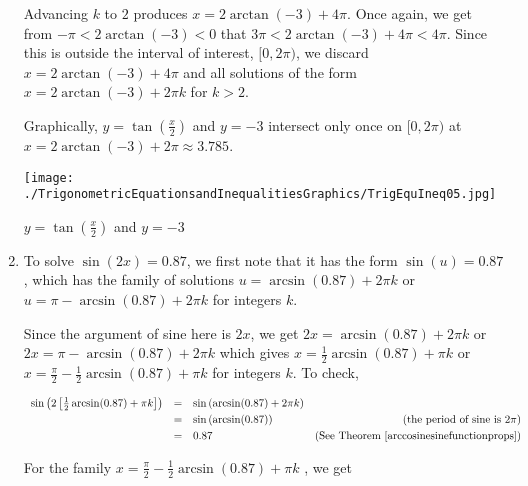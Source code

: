 \documentclass{ximera}
\begin{document}
\begin{example}
\begin{enumerate}
\smallskip

Advancing $k$ to $2$ produces $x = 2\arctan(-3) + 4\pi$. Once again, we get from $-\pi < 2\arctan(-3) < 0$ that $3\pi < 2\arctan(-3) + 4\pi < 4\pi$.  Since this is outside the interval of interest, $[0,2\pi)$,  we discard $x = 2\arctan(-3) + 4\pi$ and all solutions of the form $x = 2\arctan(-3) + 2\pi k$ for $k > 2$.   

\smallskip

Graphically, $y = \tan\left(\frac{x}{2}\right)$ and $y = -3$ intersect only once on $[0,2\pi)$ at $x = 2\arctan(-3) + 2\pi\approx 3.785$.

\smallskip

\begin{center}


\texttt{[image: ./TrigonometricEquationsandInequalitiesGraphics/TrigEquIneq05.jpg]}

{ \boldmath $y = \tan\left(\frac{x}{2}\right)$} and  $y = -3$ 

\end{center}

\item To solve $\sin(2x) = 0.87$, we first note that it has the form $\sin(u) = 0.87$, which has the family of solutions $u = \arcsin(0.87) + 2\pi k$ or $u =\pi -  \arcsin(0.87) + 2\pi k$ for integers $k$. 

\smallskip

Since the argument of sine here is $2x$, we get $2x = \arcsin(0.87) + 2\pi k$ or $2x =\pi -  \arcsin(0.87) + 2\pi k$ which gives $x = \frac{1}{2} \arcsin(0.87) + \pi k$ or $x =\frac{\pi}{2} -  \frac{1}{2}\arcsin(0.87) + \pi k$ for integers $k$.  To check,

\[ \begin{array}{rclr}

\sin\left(2\left[\frac{1}{2} \arcsin(0.87) + \pi k\right]\right)  &  = & \sin\left(\arcsin(0.87) + 2\pi k\right)  & \\ [3pt]
																													& =  & \sin\left(\arcsin(0.87)\right) & \text{(the period of sine is $2\pi$)} \\ [3pt]
																												& =  & 0.87& (\text{See Theorem } \ref{arccosinesinefunctionprops})\\
																								
\end{array}\] 


For the family $x =\frac{\pi}{2} -  \frac{1}{2}\arcsin(0.87) + \pi k$ , we get


\end{enumerate}
\end{example}
\end{document}
